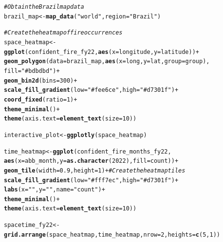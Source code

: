\documentclass{article}\usepackage[]{graphicx}\usepackage[]{xcolor}
\makeatletter
\newcommand{\hlnum}[1]{\textcolor[rgb]{0.686,0.059,0.569}{#1}}%
\newcommand{\hlstr}[1]{\textcolor[rgb]{0.192,0.494,0.8}{#1}}%
\newcommand{\hlcom}[1]{\textcolor[rgb]{0.678,0.584,0.686}{\textit{#1}}}%
\newcommand{\hlopt}[1]{\textcolor[rgb]{0,0,0}{#1}}%
\newcommand{\hlstd}[1]{\textcolor[rgb]{0.345,0.345,0.345}{#1}}%
\newcommand{\hlkwb}[1]{\textcolor[rgb]{0.69,0.353,0.396}{#1}}%
\newcommand{\hlkwc}[1]{\textcolor[rgb]{0.333,0.667,0.333}{#1}}%
\newcommand{\hlkwd}[1]{\textcolor[rgb]{0.737,0.353,0.396}{\textbf{#1}}}%
\newenvironment{kframe}{%
 \def\at@end@of@kframe{}%
 \ifinner\ifhmode%
  \def\at@end@of@kframe{\end{minipage}}%
  \begin{minipage}{\columnwidth}%
 \fi\fi%
 \def\FrameCommand##1{\hskip\@totalleftmargin \hskip-\fboxsep
 \colorbox{shadecolor}{##1}\hskip-\fboxsep
     \hskip-\linewidth \hskip-\@totalleftmargin \hskip\columnwidth}%
 \MakeFramed {\advance\hsize-\width
   \@totalleftmargin\z@ \linewidth\hsize
   \@setminipage}}%
 {\par\unskip\endMakeFramed%
 \at@end@of@kframe}
\newenvironment{knitrout}{}{} %
\makeatother
\begin{document}
\begin{knitrout}
\color{fgcolor}\begin{kframe}
\begin{alltt}
\hlcom{# Obtain the Brazil map data}
\hlstd{brazil_map} \hlkwb{<-} \hlkwd{map_data}\hlstd{(}\hlstr{"world"}\hlstd{,} \hlkwc{region} \hlstd{=} \hlstr{"Brazil"}\hlstd{)}

\hlcom{# Create the heatmap of fire occurrences}
\hlstd{space_heatmap} \hlkwb{<-} \hlkwd{ggplot}\hlstd{(confident_fire_fy22,} \hlkwd{aes}\hlstd{(}\hlkwc{x} \hlstd{= longitude,} \hlkwc{y} \hlstd{= latitude))} \hlopt{+}
  \hlkwd{geom_polygon}\hlstd{(}\hlkwc{data} \hlstd{= brazil_map,} \hlkwd{aes}\hlstd{(}\hlkwc{x} \hlstd{= long,} \hlkwc{y} \hlstd{= lat,} \hlkwc{group} \hlstd{= group),}
               \hlkwc{fill} \hlstd{=} \hlstr{"#bdbdbd"}\hlstd{)} \hlopt{+}
  \hlkwd{geom_bin2d}\hlstd{(}\hlkwc{bins} \hlstd{=} \hlnum{300}\hlstd{)} \hlopt{+}
  \hlkwd{scale_fill_gradient}\hlstd{(}\hlkwc{low} \hlstd{=} \hlstr{"#fee6ce"}\hlstd{,} \hlkwc{high} \hlstd{=} \hlstr{"#d7301f"}\hlstd{)} \hlopt{+}
  \hlkwd{coord_fixed}\hlstd{(}\hlkwc{ratio} \hlstd{=} \hlnum{1}\hlstd{)} \hlopt{+}
  \hlkwd{theme_minimal}\hlstd{()}\hlopt{+}
  \hlkwd{theme}\hlstd{(}\hlkwc{axis.text} \hlstd{=} \hlkwd{element_text}\hlstd{(}\hlkwc{size} \hlstd{=} \hlnum{10}\hlstd{))}

\hlstd{interactive_plot} \hlkwb{<-} \hlkwd{ggplotly}\hlstd{(space_heatmap)}

\hlstd{time_heatmap} \hlkwb{<-} \hlkwd{ggplot}\hlstd{(confident_fire_months_fy22,}
                       \hlkwd{aes}\hlstd{(}\hlkwc{x} \hlstd{= abb_month,} \hlkwc{y} \hlstd{=} \hlkwd{as.character}\hlstd{(}\hlnum{2022}\hlstd{),} \hlkwc{fill} \hlstd{= count))} \hlopt{+}
  \hlkwd{geom_tile}\hlstd{(}\hlkwc{width} \hlstd{=} \hlnum{0.9}\hlstd{,} \hlkwc{height} \hlstd{=} \hlnum{1}\hlstd{)} \hlopt{+}  \hlcom{# Create the heatmap tiles}
  \hlkwd{scale_fill_gradient}\hlstd{(}\hlkwc{low} \hlstd{=} \hlstr{"#fff7ec"}\hlstd{,} \hlkwc{high} \hlstd{=} \hlstr{"#d7301f"}\hlstd{)} \hlopt{+}
  \hlkwd{labs}\hlstd{(}\hlkwc{x} \hlstd{=} \hlstr{" "}\hlstd{,} \hlkwc{y} \hlstd{=} \hlstr{" "}\hlstd{,} \hlkwc{name} \hlstd{=} \hlstr{"count"}\hlstd{)} \hlopt{+}
  \hlkwd{theme_minimal}\hlstd{()} \hlopt{+}
  \hlkwd{theme}\hlstd{(}\hlkwc{axis.text} \hlstd{=} \hlkwd{element_text}\hlstd{(}\hlkwc{size} \hlstd{=} \hlnum{10}\hlstd{))}

\hlstd{spacetime_fy22} \hlkwb{<-} \hlkwd{grid.arrange}\hlstd{(space_heatmap, time_heatmap,} \hlkwc{nrow} \hlstd{=} \hlnum{2}\hlstd{,} \hlkwc{heights} \hlstd{=} \hlkwd{c}\hlstd{(}\hlnum{5}\hlstd{,}\hlnum{1}\hlstd{))}


\end{alltt}
\end{kframe}
\end{knitrout}
\end{document}
